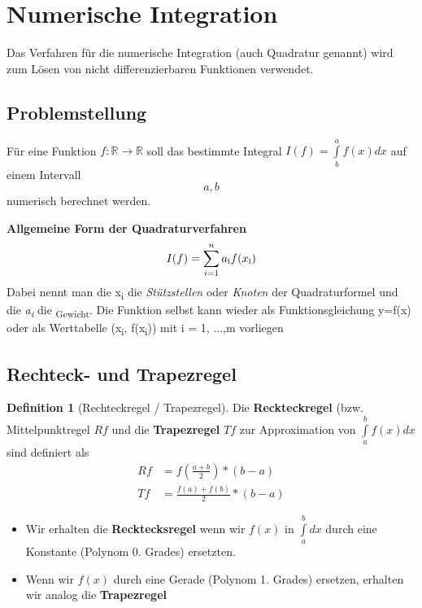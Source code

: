 \documentclass{article}
\theoremstyle{satz}
\theoremstyle{definition}
\newtheorem{definition}{Definition}
\begin{document}
\section{Numerische Integration}
Das Verfahren für die numerische Integration (auch Quadratur genannt) wird zum Lösen von nicht differenzierbaren Funktionen verwendet. 

\subsection{Problemstellung}
Für eine Funktion $f: \mathbb{R} \rightarrow 	\mathbb{R}$ soll das bestimmte Integral $I(f) = \int\limits_{b}^{a} f(x)dx$ auf einem Intervall \[a,b\] numerisch berechnet werden.

\begin{tcolorbox}
\textbf{Allgemeine Form der Quadraturverfahren}
\begin{equation}
I(f) = \sum\limits_{i=1}^{n}a\textsubscript{i}f(x\textsubscript{i})
\end{equation}
Dabei nennt man die x\textsubscript{i} die \textit{Stützstellen} oder \textit{Knoten} der Quadraturformel und die \textit{a\textsubscript{i}} die \textsubscript{Gewicht}. Die Funktion selbst kann wieder als Funktionsgleichung y=f(x) oder als Werttabelle (x\textsubscript{i}, f(x\textsubscript{i})) mit i = 1, ...,m vorliegen
\end{tcolorbox}

\subsection{Rechteck- und Trapezregel}
\theoremstyle{definition}
\begin{definition}[Rechteckregel / Trapezregel]
Die \textbf{Reckteckregel} (bzw. Mittelpunktregel $Rf$ und die \textbf{Trapezregel} $Tf$ zur Approximation von $\int\limits_{a}^{b} f(x)dx$ sind definiert als
\begin{equation}
\begin{split}
Rf & = f(\frac{a+b}{2})*(b-a)\\
Tf & = \frac{f(a) + f(b)}{2}*(b-a)
\end{split}
\end{equation}
\begin{itemize}

\item Wir erhalten die \textbf{Recktecksregel} wenn wir $f(x)$ in $\int\limits_{a}^{b}dx$ durch eine Konstante (Polynom 0. Grades) ersetzten.
\item Wenn wir $f(x)$ durch eine Gerade (Polynom 1. Grades) ersetzen, erhalten wir analog die \textbf{Trapezregel}
\end{itemize}
\end{definition}
\end{document}
